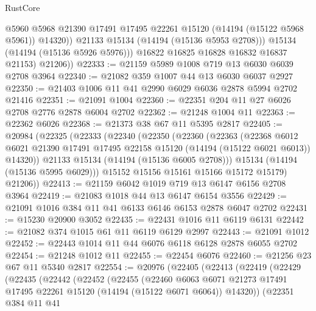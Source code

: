 \begin{lexlean}{RustCore}
\begin{coremodule}
                  @5960
                  @5968
                  @21390
                  @17491
                  @17495
                  @22261
                  @15120
                  (@14194 (@15122 @5968 @5961))
                  @14320))
              @21133
              @15134
              (@14194 (@15136 @5953 @2708)))
            @15134
            (@14194 (@15136 @5926 @5976)))
          @16822
          @16825
          @16828
          @16832
          @16837
          @21153)
        @21206))
@22333 := @21159 @5989 @1008 @719 @13 @6030 @6039 @2708 @3964
@22340 := @21082 @359 @1007 @44 @13 @6030 @6037 @2927
@22350 := @21403 @1006 @11 @41 @2990 @6029 @6036 @2878 @5994 @2702 @21416
@22351 := @21091 @1004
@22360 := @22351 @204 @11 @27 @6026 @2708 @2776 @2878 @6004 @2702
@22362 := @21248 @1004 @11
@22363 := @22362 @6026
@22368 := @21373 @38 @67 @11 @5395 @2817
@22405 := @20984
    (@22325
      (@22333
        (@22340
          (@22350
            (@22360
              (@22363
                (@22368
                  @6012
                  @6021
                  @21390
                  @17491
                  @17495
                  @22158
                  @15120
                  (@14194 (@15122 @6021 @6013))
                  @14320))
              @21133
              @15134
              (@14194 (@15136 @6005 @2708)))
            @15134
            (@14194 (@15136 @5995 @6029)))
          @15152
          @15156
          @15161
          @15166
          @15172
          @15179)
        @21206))
@22413 := @21159 @6042 @1019 @719 @13 @6147 @6156 @2708 @3964
@22419 := @21083 @1018 @44 @13 @6147 @6154 @3556
@22429 := @21091 @1016 @384 @11 @41 @6133 @6146 @6153 @2878 @6047 @2702
@22431 := @15230 @20900 @3052
@22435 := @22431 @1016 @11 @6119 @6131
@22442 := @21082 @374 @1015 @61 @11 @6119 @6129 @2997
@22443 := @21091 @1012
@22452 := @22443 @1014 @11 @44 @6076 @6118 @6128 @2878 @6055 @2702
@22454 := @21248 @1012 @11
@22455 := @22454 @6076
@22460 := @21256 @23 @67 @11 @5340 @2817
@22554 := @20976
    (@22405
      (@22413
        (@22419
          (@22429
            (@22435
              (@22442
                (@22452
                  (@22455
                    (@22460
                      @6063
                      @6071
                      @21273
                      @17491
                      @17495
                      @22261
                      @15120
                      (@14194 (@15122 @6071 @6064))
                      @14320))
                  (@22351
                    @384
                    @11
                    @41

\end{coremodule}
\end{lexlean}
